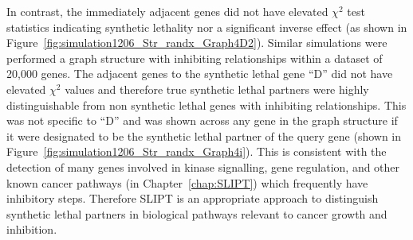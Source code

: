 In contrast, the immediately adjacent genes did not have elevated $\chi^2$ test statistics indicating synthetic lethality nor a significant inverse effect (as shown in Figure~\ref{fig:simulation1206_Str_randx_Graph4D2}). Similar simulations were performed a graph structure with inhibiting relationships within a dataset of 20,000 genes. The adjacent genes to the synthetic lethal gene ``D'' did not have elevated $\chi^2$ values and therefore true synthetic lethal partners were highly distinguishable from non synthetic lethal genes with inhibiting relationships. This was not specific to ``D'' and was shown across any gene in the graph structure if it were designated to be the synthetic lethal partner of the query gene (shown in Figure~\ref{fig:simulation1206_Str_randx_Graph4i}). This is consistent with the detection of many genes involved in kinase signalling, gene regulation, and other known cancer pathways (in Chapter~\ref{chap:SLIPT}) which frequently have inhibitory steps. Therefore \gls{SLIPT} is an appropriate approach to distinguish synthetic lethal partners in biological pathways relevant to cancer growth and inhibition.


\iffalse
\begin{figure*}[!ht]
\begin{mdframed}
     \begin{center}
       \subcaptionbox{Graph Structure}{%
           \raisebox{0.15\textwidth}{
           \label{fig:simulation1206_Str_randx_Graph4iD:Graph4i}
           \texttt{[image: \{"/home/tomkelly/Documents/PhD Otago Uni/SL\_Model/Graph4iD".pdf]}}
           }
        }%
       \subcaptionbox{$\chi^2$ distribution for each gene}{%
           \label{fig:simulation1206_Str_randx_Graph4iD:vioplot}
           \texttt{[image: \{"/home/tomkelly/Documents/PhD Otago Uni/SL\_Model//RUN\_20161206\_Str\_randx/SL\_Model\_Test\_Graph\_1K\_Graph4i\_ROC\_samples\_SLstry\_vioplot(4)".pdf]}}
        }%
       \end{center}
      \caption[Detection of Synthetic Lethality within an Inhibiting Graph Structure]{\small \textbf{Detection of Synthetic Lethality within an Inhibiting  Graph Structure.} The gene ``D'' was designated to be synthetic lethal and the $\chi^2$ value from \gls{SLIPT} was computed for each gene across the graph structure. The $\chi^2$ values were computed in 100 simulations of datasets of 20,000 genes including the graph structure and 1000 samples.}
\end{mdframed}
\end{figure*}
\fi


